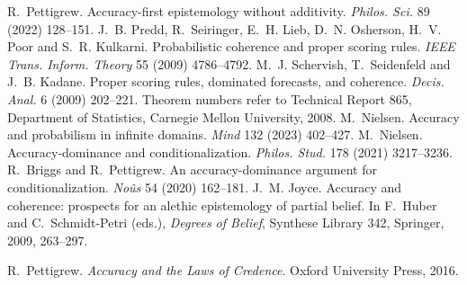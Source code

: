  R.~Pettigrew. Accuracy-first epistemology without additivity. \emph{Philos. Sci.} 89 (2022) 128--151.
 J.~B. Predd, R.~Seiringer, E.~H. Lieb, D.~N. Osherson, H.~V. Poor and S.~R. Kulkarni. Probabilistic coherence and proper scoring rules. \emph{IEEE Trans. Inform. Theory} 55 (2009) 4786--4792.
 M.~J. Schervish, T.~Seidenfeld and J.~B. Kadane. Proper scoring rules, dominated forecasts, and coherence. \emph{Decis. Anal.} 6 (2009) 202--221. Theorem numbers refer to Technical Report 865, Department of Statistics, Carnegie Mellon University, 2008.
 M.~Nielsen. Accuracy and probabilism in infinite domains. \emph{Mind} 132 (2023) 402--427.
 M.~Nielsen. Accuracy-dominance and conditionalization. \emph{Philos. Stud.} 178 (2021) 3217--3236.
 R.~Briggs and R.~Pettigrew. An accuracy-dominance argument for conditionalization. \emph{No\^us} 54 (2020) 162--181.
 J.~M. Joyce. Accuracy and coherence: prospects for an alethic epistemology of partial belief. In F.~Huber and C.~Schmidt-Petri (eds.), \emph{Degrees of Belief}, Synthese Library 342, Springer, 2009, 263--297.

 R.~Pettigrew. \emph{Accuracy and the Laws of Credence}. Oxford University Press, 2016.
